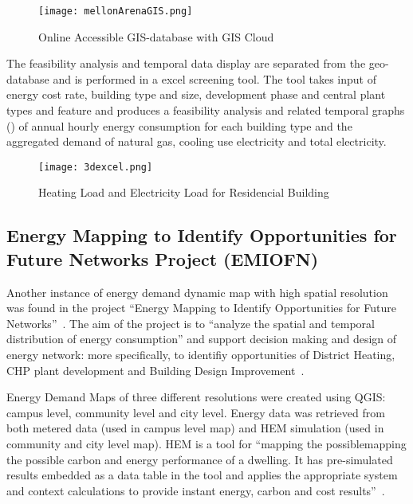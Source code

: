 \begin{figure}[h!]
  \centering
  \texttt{[image: mellonArenaGIS.png]}
  \caption[Lower Hill District 3D GIS Map]{Online Accessible GIS-database with GIS
    Cloud~\cite{baird2014, Ramesh2013}}
  \label{fig:mellonArenaGIS}
\end{figure}

The feasibility analysis and temporal data display are separated from
the geo-database and is performed in a excel screening tool. The tool
takes input of energy cost rate, building type and size, development
phase and central plant types and feature and produces a feasibility
analysis and related temporal graphs () of annual
hourly energy consumption for each building type and the aggregated
demand of natural gas, cooling use electricity and total electricity.

\begin{figure}[h!]
  \centering
  \texttt{[image: 3dexcel.png]}
  \caption[Heating/Electricity Residential]{Heating Load and
    Electricity Load for Residencial Building~\cite{baird2014}}
  \label{fig:3dexcel}
\end{figure}

\subsection{Energy Mapping to Identify Opportunities for Future
  Networks Project (EMIOFN)}
Another instance of energy demand dynamic map with high spatial
resolution was found in the project ``Energy Mapping to Identify
Opportunities for Future Networks''~\cite{Diaz2013}. The aim of the
project is to ``analyze the spatial and temporal distribution of
energy consumption'' and support decision making and design of energy
network: more specifically, to identifiy opportunities of District
Heating, CHP plant development and Building Design
Improvement~\cite{Diaz2013}.

Energy Demand Maps of three different resolutions were created using
QGIS: campus level, community level and city level. Energy data was
retrieved from both metered data (used in campus level map) and HEM
simulation (used in community and city level map). HEM is a tool for
``mapping the possiblemapping the possible carbon and energy
performance of a dwelling. It has pre-simulated results embedded as a
data table in the tool and applies the appropriate system and context
calculations to provide instant energy, carbon and cost results''~\cite{HEMesru2015}.


